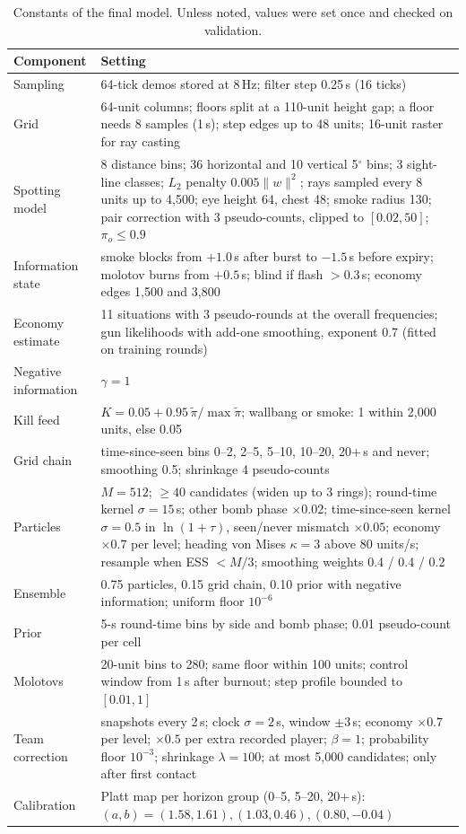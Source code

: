 \documentclass[11pt]{article}
\newcommand{\1}{\mathbb{1}}
\begin{document}
\begin{table}[H]
\centering
\caption{Constants of the final model. Unless noted, values were set once and checked on validation.}
\label{tab:hyper}
\small
\begin{tabularx}{\linewidth}{@{}lX@{}}
\toprule
Component & Setting \\
\midrule
Sampling & 64-tick demos stored at 8\,Hz; filter step 0.25\,s (16 ticks) \\
Grid & 64-unit columns; floors split at a 110-unit height gap; a floor needs 8 samples (1\,s); step edges up to 48 units; 16-unit raster for ray casting \\
Spotting model & 8 distance bins; 36 horizontal and 10 vertical 5$^\circ$ bins; 3 sight-line classes; $L_2$ penalty $0.005\|w\|^2$; rays sampled every 8 units up to 4{,}500; eye height 64, chest 48; smoke radius 130; pair correction with 3 pseudo-counts, clipped to $[0.02, 50]$; $\pi_o \le 0.9$ \\
Information state & smoke blocks from $+1.0$\,s after burst to $-1.5$\,s before expiry; molotov burns from $+0.5$\,s; blind if flash $> 0.3$\,s; economy edges 1{,}500 and 3{,}800 \\
Economy estimate & 11 situations with 3 pseudo-rounds at the overall frequencies; gun likelihoods with add-one smoothing, exponent 0.7 (fitted on training rounds) \\
Negative information & $\gamma = 1$ \\
Kill feed & $K = 0.05 + 0.95\,\tilde\pi/\max\tilde\pi$; wallbang or smoke: 1 within 2{,}000 units, else 0.05 \\
Grid chain & time-since-seen bins 0--2, 2--5, 5--10, 10--20, 20+\,s and never; smoothing 0.5; shrinkage 4 pseudo-counts \\
Particles & $M = 512$; $\ge 40$ candidates (widen up to 3 rings); round-time kernel $\sigma = 15$\,s; other bomb phase $\times 0.02$; time-since-seen kernel $\sigma = 0.5$ in $\ln(1 + \tau)$, seen/never mismatch $\times 0.05$; economy $\times 0.7$ per level; heading von Mises $\kappa = 3$ above 80 units/s; resample when ESS $< M/3$; smoothing weights 0.4 / 0.4 / 0.2 \\
Ensemble & 0.75 particles, 0.15 grid chain, 0.10 prior with negative information; uniform floor $10^{-6}$ \\
Prior & 5-s round-time bins by side and bomb phase; 0.01 pseudo-count per cell \\
Molotovs & 20-unit bins to 280; same floor within 100 units; control window from 1\,s after burnout; step profile bounded to $[0.01, 1]$ \\
Team correction & snapshots every 2\,s; clock $\sigma = 2$\,s, window $\pm 3$\,s; economy $\times 0.7$ per level; $\times 0.5$ per extra recorded player; $\beta = 1$; probability floor $10^{-3}$; shrinkage $\lambda = 100$; at most 5{,}000 candidates; only after first contact \\
Calibration & Platt map per horizon group (0--5, 5--20, 20+\,s): $(a, b) = (1.58, 1.61), (1.03, 0.46), (0.80, -0.04)$ \\
\bottomrule
\end{tabularx}
\end{table}
\end{document}
